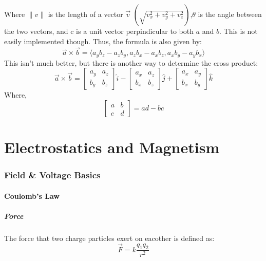 \documentclass[a4paper,12pt]{article}
\begin{document}
								Where $\|v\|$ is the length of a vector $\vec{v}$  $\left( \sqrt{v_{x}^{2} + v_{y}^{2} + v_{z}^{2}}\right)$,$\theta$ is the angle between the two vectors, and c is a unit vector perpindicular to both $a$ and $b$. This is not easily implemented though. Thus, the formula is also given by:
								\begin{equation*}
										\vec{a} \times \vec{b} = \langle a_{y}b_{z} - a_{z}b_{y}, a_{z}b_{x} - a_{x}b_{z}, a_{x}b_{y}-a_{y}b_{x}\rangle
								\end{equation*}
								This isn't much better, but there is another way to determine the cross product:
								\begin{equation*}
										\vec{a} \times \vec{b} = \begin{bmatrix}
												a_{y} & a_{z} \\
												b_{y} & b_{z} 
										\end{bmatrix}\hat{i} - \begin{bmatrix}
												a_{x} & a_{z} \\
												b_{x}& b_{z} 
										\end{bmatrix}\hat{j} + \begin{bmatrix}
												a_{x} & a_{y} \\
												b_{x}& b_{y} 
										\end{bmatrix}\hat{k} 
								\end{equation*}
								Where,
								\begin{equation*}
										\begin{bmatrix}
												a & b \\
												c & d
										\end{bmatrix} = ad-bc
								\end{equation*}
		\newpage
\part{Electrostatics and Magnetism}
		\section{Field \& Voltage Basics}
				\subsection{Coulomb's Law}
						\subsubsection{Force}
								The force that two charge particles exert on eacother is defined as:
								\begin{equation*}
										\vec{F} = k\frac{q_{1}q_{2}}{r^{2}}
								\end{equation*}
\end{document}
